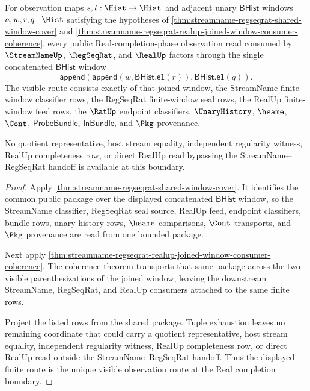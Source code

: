 \begin{theorem}
\label{thm:real-completion-boundary-unique-observation-route}
For observation maps $s,t:\Hist\to\Hist$ and adjacent unary $\mathsf{BHist}$
windows $a,w,r,q:\Hist$ satisfying the hypotheses of
\autoref{thm:streamname-regseqrat-shared-window-cover} and
\autoref{thm:streamname-regseqrat-realup-joined-window-consumer-coherence},
every public Real-completion-phase observation read consumed by
$\StreamNameUp$, $\RegSeqRat$, and $\RealUp$ factors through the single
concatenated $\mathsf{BHist}$ window
$$
\mathsf{append}(\mathsf{append}(w,\mathsf{BHist.e1}(r)),
\mathsf{BHist.e1}(q)).
$$
The visible route consists exactly of that joined window, the StreamName
finite-window classifier rows, the RegSeqRat finite-window seal rows, the
RealUp finite-window feed rows, the $\RatUp$ endpoint classifiers,
$\UnaryHistory$, $\hsame$, $\Cont$, $\mathsf{ProbeBundle}$,
$\mathsf{InBundle}$, and $\Pkg$ provenance.

No quotient representative, host stream equality, independent regularity
witness, RealUp completeness row, or direct RealUp read bypassing the
StreamName--RegSeqRat handoff is available at this boundary.
\end{theorem}
\begin{proof}
Apply \autoref{thm:streamname-regseqrat-shared-window-cover}. It identifies
the common public package over the displayed concatenated $\mathsf{BHist}$
window, so the StreamName classifier, RegSeqRat seal source, RealUp feed,
endpoint classifiers, bundle rows, unary-history rows, $\hsame$ comparisons,
$\Cont$ transports, and $\Pkg$ provenance are read from one bounded package.

Next apply
\autoref{thm:streamname-regseqrat-realup-joined-window-consumer-coherence}. The
coherence theorem transports that same package across the two visible
parenthesizations of the joined window, leaving the downstream StreamName,
RegSeqRat, and RealUp consumers attached to the same finite rows.

Project the listed rows from the shared package. Tuple exhaustion leaves no
remaining coordinate that could carry a quotient representative, host stream
equality, independent regularity witness, RealUp completeness row, or direct
RealUp read outside the StreamName--RegSeqRat handoff. Thus the displayed
finite route is the unique visible observation route at the Real completion
boundary.
\end{proof}

